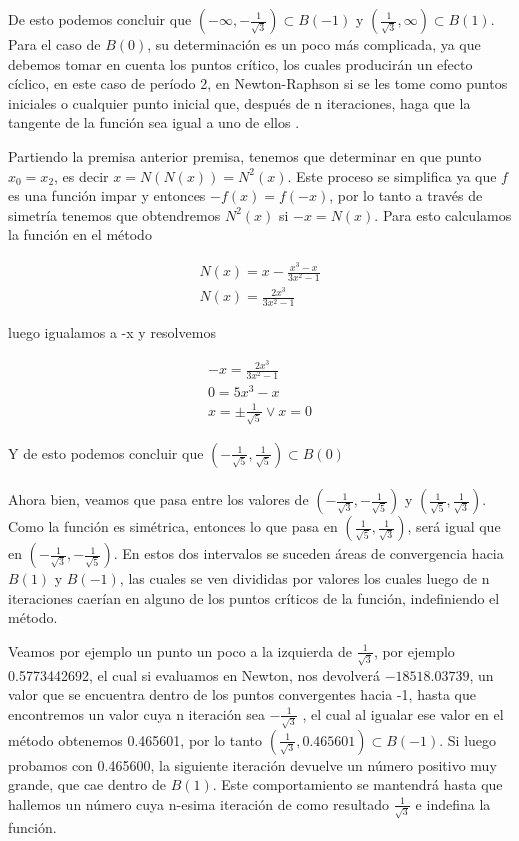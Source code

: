 De esto podemos concluir que $(-\infty,-\frac{1}{\sqrt{3}}) \subset  B(-1)$ y $(\frac{1}{\sqrt{3}}, \infty) \subset  B(1)$. Para el caso de $B(0)$, su determinación es un poco más complicada, ya que debemos tomar en cuenta los puntos crítico, los cuales producirán un efecto cíclico, en este caso de período 2, en Newton-Raphson si se les tome como puntos iniciales o cualquier punto inicial que, después de n iteraciones, haga que la tangente de la función sea igual a uno de ellos \cite{wiersma}. 

Partiendo la premisa anterior premisa, tenemos que determinar en que punto $x_0 = x_2$, es decir $x = N(N(x)) = N^2(x)$.  Este proceso se simplifica ya que $f$ es una función impar y entonces $-f(x) = f(-x)$, por lo tanto a través de simetría tenemos que obtendremos $N^2(x)$ si $-x = N(x)$. Para esto calculamos la función en el método

\begin{gather*}
    N(x) = x - \frac{x^3-x}{3x^2-1} \\
    N(x) = \frac{2x^3}{3x^2-1}
\end{gather*}

luego igualamos a -x y resolvemos

\begin{gather*}
    -x = \frac{2x^3}{3x^2-1}\\
    0 = 5x^3-x\\
    x = \pm \frac{1}{\sqrt{5}} \vee x = 0
\end{gather*}

Y de esto podemos concluir que $(-\frac{1}{\sqrt{5}},\frac{1}{\sqrt{5}}) \subset B(0)$
\\
\\
Ahora bien, veamos que pasa entre los valores de $(-\frac{1}{\sqrt{3}},-\frac{1}{\sqrt{5}})$ y $(\frac{1}{\sqrt{5}},\frac{1}{\sqrt{3}})$. Como la función es simétrica, entonces lo que pasa en $(\frac{1}{\sqrt{5}},\frac{1}{\sqrt{3}})$, será igual que en $(-\frac{1}{\sqrt{3}},-\frac{1}{\sqrt{5}})$. En estos dos intervalos se suceden áreas de convergencia hacia $B(1)$ y $B(-1)$, las cuales se ven divididas por valores los cuales luego de n iteraciones caerían en alguno de los puntos críticos de la función, indefiniendo el método.



Veamos por ejemplo un punto un poco a la izquierda de $\frac{1}{\sqrt{3}}$, por ejemplo 0.5773442692, el cual si evaluamos en Newton, nos devolverá $-18518.03739$, un valor que se encuentra dentro de los puntos convergentes hacia -1, hasta que encontremos un valor cuya n iteración sea $-\frac{1}{\sqrt{3}}$ , el cual al igualar ese valor en el método obtenemos 0.465601, por lo tanto $(\frac{1}{\sqrt{3}},0.465601) \subset  B(-1)$.
Si luego probamos con 0.465600, la siguiente iteración devuelve un número positivo muy grande, que cae dentro de $B(1)$. Este comportamiento se mantendrá hasta que hallemos un número cuya n-esima iteración de como resultado $\frac{1}{\sqrt{3}}$ e indefina la función. 

